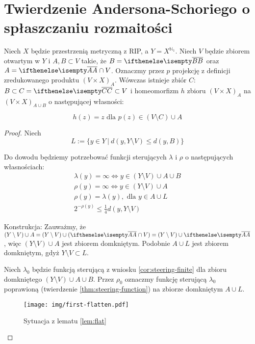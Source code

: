 \section{Twierdzenie Andersona-Schoriego o spłaszczaniu rozmaitości}

\begin{lem} \label{lem:flat}
  Niech $X$ będzie przestrzenią metryczną z RIP, a $Y = X^{\mathbb{N}_1}$. Niech $V$ będzie zbiorem otwartym w $Y$ i $A, B \subset V$ takie, że $B = \cl{B}$ oraz $A = \cl{A} \cap V$. Oznaczmy przez $p$ projekcję z definicji zredukowanego produktu $(V \times X)_A$. Wówczas istnieje zbiór $C$: $B \subset C = \cl{C} \subset V$ i homeomorfizm $h$ zbioru $(V \times X)_A$ na $(V \times X)_{A \cup B}$ o następującej własności:
  
  \begin{equation} \label{eq:as-lem-1}
  h(z) = z \mbox{ dla } p(z) \in (V \setminus C) \cup A
  \end{equation}
  \begin{proof}
    Niech
    \[L := \{y \in Y\ |\ d(y, Y \setminus V) \leq d(y, B)\}\]
    
    Do dowodu będziemy potrzebować funkcji sterujących $\lambda$ i $\rho$ o następujących własnościach:
    \begin{gather}
      \label{lambda-infty} \lambda(y) = \infty \Leftrightarrow y \in (Y \setminus V) \cup A \cup B \\
      \label{rho-infty} \rho(y) = \infty \Leftrightarrow y \in (Y \setminus V) \cup A \\
      \label{rho-eq-lambda} \rho(y) = \lambda(y), \mbox{ dla } y \in A \cup L \\
      \label{rho-dist} 2^{-\rho(y)} \leq \frac{1}{4} d(y, Y \setminus V)
    \end{gather}
    
    Konstrukcja:
    Zauważmy, że $(Y \setminus V) \cup A = (Y \setminus V) \cup (\cl{A} \cap V) = (Y \setminus V) \cup \cl{A}$, więc $(Y \setminus V) \cup A$ jest zbiorem domkniętym. Podobnie $A \cup L$ jest zbiorem domkniętym, gdyż $Y \setminus V \subset L$.
    
    Niech $\lambda_0$ będzie funkcją sterującą z wniosku \ref{cor:steering-finite} dla zbioru domkniętego $(Y \setminus V) \cup A \cup B$. Przez $\rho_0$ oznaczmy funkcję sterującą $\lambda_0$ poprawioną (twierdzenie \ref{thm:steering-function}) na zbiorze domkniętym $A \cup L$.
    
    \begin{figure}[h!]
      \centering
      \texttt{[image: img/first-flatten.pdf]}
      \caption{Sytuacja z lematu \ref{lem:flat}}
    \end{figure}
    

\end{proof}
\end{lem}
